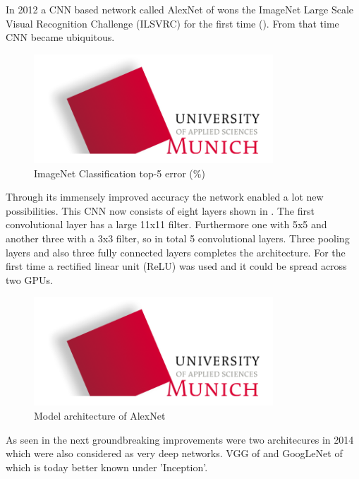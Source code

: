 In 2012 a CNN based network called AlexNet of \citet{Krizhevsky2012} wons the ImageNet Large Scale Visual Recognition Challenge (ILSVRC) for the first time (). From that time CNN became ubiquitous.
\begin{figure}[htbp]
\includegraphics[width=0.8\textwidth]{includes/MUASlogo}
\caption[ImageNet Classification top-5 error]{ImageNet Classification top-5 error (\%) \citep{He2016}}
\label{fig:FH-Logo1}
\end{figure}
Through its immensely improved accuracy the network enabled a lot new possibilities. This CNN now consists of eight layers shown in . The first convolutional layer has a large 11x11 filter. Furthermore one with 5x5 and another three with a 3x3 filter, so in total 5 convolutional layers. Three pooling layers and also three fully connected layers completes the architecture. For the first time a rectified linear unit (ReLU) was used and it could be spread across two GPUs.

\begin{figure}[htbp]
\includegraphics[width=0.8\textwidth]{includes/MUASlogo}
\caption[Model architecture of AlexNet]{Model architecture of AlexNet \citep{He2016}}
\label{fig:FH-Logo2}
\end{figure}

As seen in  the next groundbreaking improvements were two architecures in 2014 which were also considered as very deep networks. VGG of \citet{Simonyan2015} and GoogLeNet of \citet{Szegedy2014} which is today better known under  'Inception'. 

